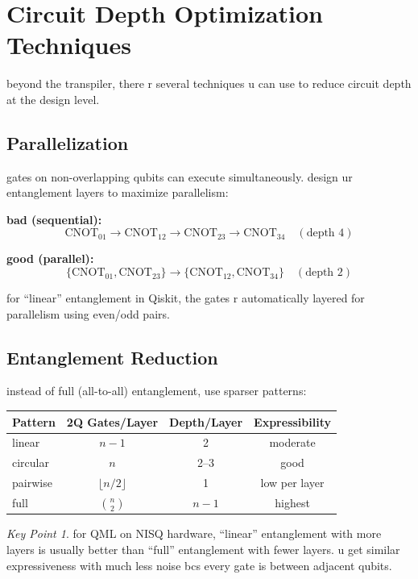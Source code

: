 \documentclass[11pt,a4paper]{article}
\theoremstyle{definition}
\theoremstyle{remark}
\newtheorem*{keypoint}{Key Point}
\begin{document}
\section{Circuit Depth Optimization Techniques}

beyond the transpiler, there r several techniques u can use to reduce circuit depth at the design level.

\subsection{Parallelization}

gates on non-overlapping qubits can execute simultaneously. design ur entanglement layers to maximize parallelism:

\textbf{bad (sequential):}
\[
\text{CNOT}_{01} \to \text{CNOT}_{12} \to \text{CNOT}_{23} \to \text{CNOT}_{34} \quad (\text{depth } 4)
\]

\textbf{good (parallel):}
\[
\{\text{CNOT}_{01}, \text{CNOT}_{23}\} \to \{\text{CNOT}_{12}, \text{CNOT}_{34}\} \quad (\text{depth } 2)
\]

for ``linear'' entanglement in Qiskit, the gates r automatically layered for parallelism using even/odd pairs.

\subsection{Entanglement Reduction}

instead of full (all-to-all) entanglement, use sparser patterns:

\begin{center}
\renewcommand{\arraystretch}{1.3}
\begin{tabular}{|l|c|c|c|}
\hline
\textbf{Pattern} & \textbf{2Q Gates/Layer} & \textbf{Depth/Layer} & \textbf{Expressibility} \\
\hline
linear & $n-1$ & 2 & moderate \\
\hline
circular & $n$ & 2--3 & good \\
\hline
pairwise & $\lfloor n/2 \rfloor$ & 1 & low per layer \\
\hline
full & $\binom{n}{2}$ & $n-1$ & highest \\
\hline
\end{tabular}
\end{center}

\begin{keypoint}
for QML on NISQ hardware, ``linear'' entanglement with more layers is usually better than ``full'' entanglement with fewer layers. u get similar expressiveness with much less noise bcs every gate is between adjacent qubits.
\end{keypoint}
\end{document}
